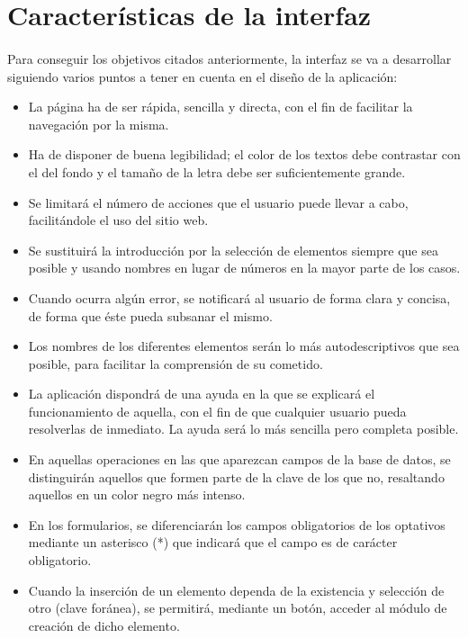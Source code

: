 \section{Características de la interfaz}

  \paragraph{}Para conseguir los objetivos citados anteriormente, la interfaz se
  va a desarrollar siguiendo varios puntos a tener en cuenta en el diseño de la
  aplicación:

  \begin{itemize}
   \item La página ha de ser rápida, sencilla y directa, con el fin de facilitar
   la navegación por la misma.
   \item Ha de disponer de buena legibilidad; el color de los textos debe
   contrastar con el del fondo y el tamaño de la letra debe ser suficientemente
   grande.
   \item Se limitará el número de acciones que el usuario puede llevar a cabo,
   facilitándole el uso del sitio web.
   \item Se sustituirá la introducción por la selección de elementos siempre
   que sea posible y usando nombres en lugar de números en la mayor parte de
   los casos.
   \item Cuando ocurra algún error, se notificará al usuario de forma clara y
   concisa, de forma que éste pueda subsanar el mismo.
   \item Los nombres de los diferentes elementos serán lo más autodescriptivos
   que sea posible, para facilitar la comprensión de su cometido.
   \item La aplicación dispondrá de una ayuda en la que se explicará el
   funcionamiento de aquella, con el fin de que cualquier usuario pueda
   resolverlas de inmediato. La ayuda será lo más sencilla pero completa
   posible.
   \item En aquellas operaciones en las que aparezcan campos de la base de
   datos, se distinguirán aquellos que formen parte de la clave de los que no,
   resaltando aquellos en un color negro más intenso.
   \item En los formularios, se diferenciarán los campos obligatorios de los
   optativos mediante un asterisco (*) que indicará que el campo es de carácter
   obligatorio.
   \item Cuando la inserción de un elemento dependa de la existencia y selección
   de otro (clave foránea), se permitirá, mediante un botón, acceder al módulo
   de creación de dicho elemento.
  \end{itemize}
